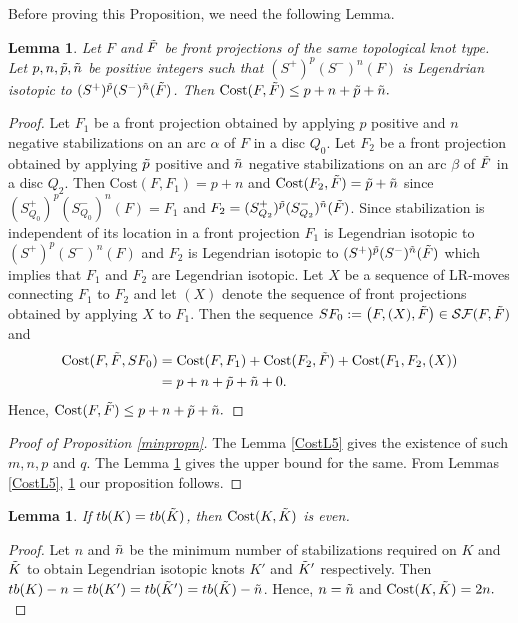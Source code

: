 \documentclass[11pt]{amsart}
\numberwithin{equation}{section}
\theoremstyle{plain}
\newtheorem{Lemma}[equation]{Lemma}
\theoremstyle{definition}
\theoremstyle{remark} \newtheorem{remark}[equation]{Remark}
\theoremstyle{remark} \newtheorem{observation}[equation]{Observation}
\newcommand{\Cost}{\text{Cost}}
\begin{document}
Before proving this Proposition, we need the following Lemma.

\begin{Lemma}\label{CostL6}
    Let $F$ and $\Tilde{F}$ be front projections of the same topological knot type. Let $p,n,\Tilde{p},\Tilde{n}$ be positive integers such that $(S^+)^p(S^-)^n(F)$ is Legendrian isotopic to  $(S^+)^{\Tilde{p}}(S^-)^{\Tilde{n}}(\Tilde{F})$. Then $\Cost(F,\Tilde{F})\leq p+n+\Tilde{p}+\Tilde{n}.$
\end{Lemma}
\begin{proof}
    Let $F_1$ be a front projection obtained by applying $p$ positive and $n$ negative stabilizations on an arc $\alpha$ of $F$ in a disc $Q_0$. Let $F_2$  be a front projection obtained by applying $\Tilde{p}$ positive and $\Tilde{n}$ negative stabilizations on an arc $\beta$ of $\Tilde{F}$ in a disc $Q_2$. Then $\Cost(F,F_1)=p+n$ and $\Cost(F_2,\Tilde{F})=\Tilde{p}+\Tilde{n}$ since $(S^+_{Q_0})^{p}(S^-_{Q_0})^n(F)= F_1$ and $F_2= (S^+_{Q_2})^{\Tilde{p}}(S^-_{Q_2})^{\Tilde{n}}(\Tilde{F})$. Since stabilization is independent of its location in a front projection $F_1$ is Legendrian isotopic to $(S^+)^p(S^-)^n(F)$ and $F_2$ is Legendrian isotopic to $(S^+)^{\Tilde{p}}(S^-)^{\Tilde{n}}(\Tilde{F})$ which implies that $F_1$ and $F_2$ are Legendrian isotopic. Let $X$ be a sequence of LR-moves connecting $F_1$ to $F_2$ and let $(X)$ denote the sequence of front projections obtained by applying $X$ to $F_1$. Then the sequence $SF_0:=\left(F,(X),\Tilde{F}\right) \in \mathcal{SF}(F,\Tilde{F})$ and
    \begin{align*}
\Cost(F,\Tilde{F},SF_0)&=\Cost(F,F_1)+\Cost(F_2,\Tilde{F})+\Cost(F_1,F_2,(X))\\
&=p+n+\Tilde{p}+\Tilde{n}+0.
    \end{align*}
    Hence, $\Cost(F,\Tilde{F})\leq p+n+\Tilde{p}+\Tilde{n}. $ 
\end{proof}
\begin{proof}[Proof of Proposition \ref{minpropn}]
    

The Lemma \ref{CostL5} gives the existence of such $m,n, p$ and $q$. The Lemma \ref{CostL6} gives the upper bound for the same. From Lemmas \ref{CostL5}, \ref{CostL6} our proposition follows.
\end{proof}


\begin{Lemma}\label{CostL7}
If $tb(K)=tb(\Tilde{K})$, then $\Cost(K,\Tilde{K})$ is even. 
\end{Lemma}
\begin{proof}
   Let $n$ and $\Tilde{n}$ be the minimum number of stabilizations required on $K$ and $\Tilde{K}$ to obtain Legendrian isotopic knots $K'$ and $\Tilde{K}'$ respectively. Then $tb(K)-n =tb(K')=tb(\Tilde{K}')=tb(\Tilde{K})-\Tilde{n}$. Hence, $n=\Tilde{n}$ and $\Cost(K,\Tilde{K})=2n.$
\end{proof}
\end{document}
